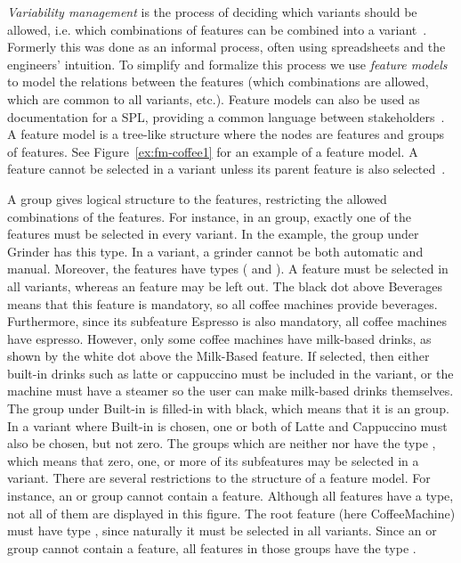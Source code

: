 \emph{Variability management} is the process of deciding which variants should be allowed, i.e. which combinations of features can be combined into a variant~\cite{art:variability-management-with-feature-models}. Formerly this was done as an informal process, often using spreadsheets and the engineers' intuition. To simplify and formalize this process we use \emph{feature models} to model the relations between the features (which combinations are allowed, which are common to all variants, etc.). Feature models can also be used as documentation for a SPL, providing a common language between stakeholders~\cite{book:introduction-to-spl}. A feature model is a tree-like structure where the nodes are features and groups of features. See Figure~\vref{ex:fm-coffee1} for an example of a feature model. A feature cannot be selected in a variant unless its parent feature is also selected~\cite{art:feature-models-grammars-and-propositional-formulas}.

A group gives logical structure to the features, restricting the allowed combinations of the features. For instance, in an \xortype{} group, exactly one of the features must be selected in every variant. In the example, the group under Grinder has this type. In a variant, a grinder cannot be both automatic and manual. Moreover, the features have types (\optional{} and \mandatory{}). A \mandatory{} feature must be selected in all variants, whereas an \optional{} feature may be left out. The black dot above Beverages means that this feature is mandatory, so all coffee machines provide beverages. Furthermore, since its subfeature Espresso is also mandatory, all coffee machines have espresso. However, only some coffee machines have milk-based drinks, as shown by the white dot above the Milk-Based feature. If selected, then either built-in drinks such as latte or cappuccino must be included in the variant, or the machine must have a steamer so the user can make milk-based drinks themselves. The group under Built-in is filled-in with black, which means that it is an \ortype{} group. In a variant where Built-in is chosen, one or both of Latte and Cappuccino must also be chosen, but not zero. The groups which are neither \xortype{} nor \ortype{} have the type \andtype{}, which means that zero, one, or more of its subfeatures may be selected in a variant. There are several restrictions to the structure of a feature model. For instance, an \xortype{} or \ortype{} group cannot contain a \mandatory{} feature. Although all features have a type, not all of them are displayed in this figure. The root feature (here CoffeeMachine) must have type \mandatory{}, since naturally it must be selected in all variants. Since an \xortype{} or \ortype{} group cannot contain a \mandatory{} feature, all features in those groups have the type \optional{}.

